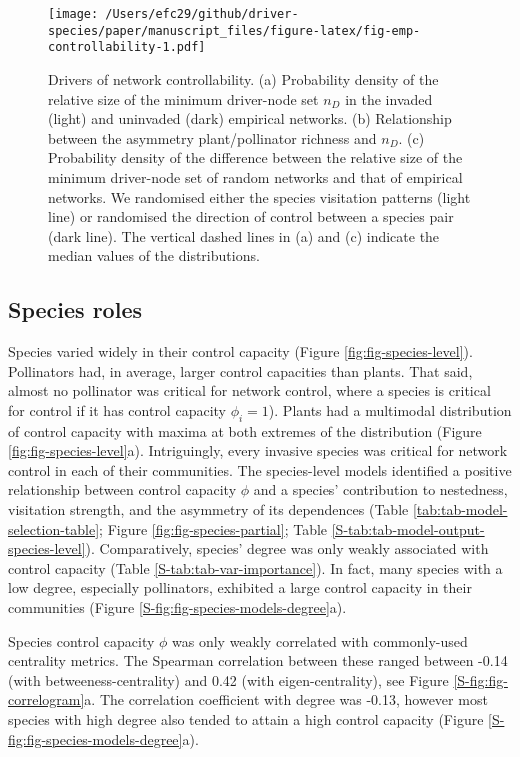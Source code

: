 \documentclass[a4paper]{artikel1}
\theoremstyle{definition}
\theoremstyle{definition}
\theoremstyle{definition}
\theoremstyle{remark}
\begin{document}
\begin{figure}
\centering
\texttt{[image: /Users/efc29/github/driver-species/paper/manuscript\_files/figure-latex/fig-emp-controllability-1.pdf]}
\caption{\label{fig:fig-emp-controllability}Drivers of network
controllability. (a) Probability density of the relative size of the
minimum driver-node set \(n_D\) in the invaded (light) and uninvaded
(dark) empirical networks. (b) Relationship between the asymmetry
plant/pollinator richness and \(n_D\). (c) Probability density of the
difference between the relative size of the minimum driver-node set of
random networks and that of empirical networks. We randomised either the
species visitation patterns (light line) or randomised the direction of
control between a species pair (dark line). The vertical dashed lines in
(a) and (c) indicate the median values of the distributions.}
\end{figure}

\subsection{Species roles}\label{species-roles-1}

Species varied widely in their control capacity (Figure
\ref{fig:fig-species-level}). Pollinators had, in average, larger
control capacities than plants. That said, almost no pollinator was
critical for network control, where a species is critical for control if
it has control capacity \(\phi_i = 1\)). Plants had a multimodal
distribution of control capacity with maxima at both extremes of the
distribution (Figure \ref{fig:fig-species-level}a). Intriguingly, every
invasive species was critical for network control in each of their
communities. The species-level models identified a positive relationship
between control capacity \(\phi\) and a species' contribution to
nestedness, visitation strength, and the asymmetry of its dependences
(Table \ref{tab:tab-model-selection-table}; Figure
\ref{fig:fig-species-partial}; Table
\ref{S-tab:tab-model-output-species-level}). Comparatively, species'
degree was only weakly associated with control capacity (Table
\ref{S-tab:tab-var-importance}). In fact, many species with a low
degree, especially pollinators, exhibited a large control capacity in
their communities (Figure \ref{S-fig:fig-species-models-degree}a).

Species control capacity \(\phi\) was only weakly correlated with
commonly-used centrality metrics. The Spearman correlation between these
ranged between -0.14 (with betweeness-centrality) and 0.42 (with
eigen-centrality), see Figure \ref{S-fig:fig-correlogram}a. The
correlation coefficient with degree was -0.13, however most species with
high degree also tended to attain a high control capacity (Figure
\ref{S-fig:fig-species-models-degree}a).
\end{document}
